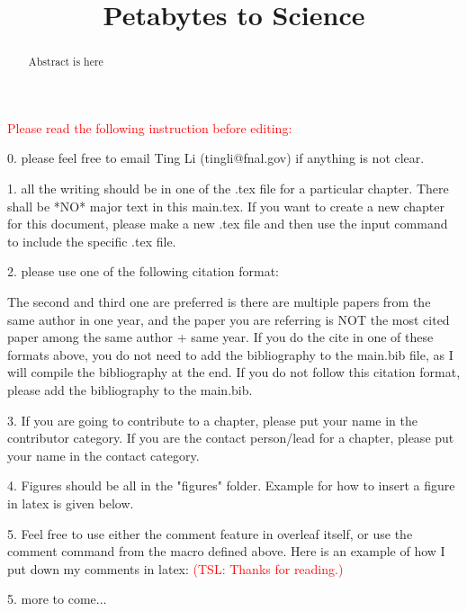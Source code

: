\documentclass[modern,linenumbers]{aastex62}
\newcommand{\Comment}[3]{\textcolor{#1}{(#2: #3)}}
\newcommand{\TSL}[1]{\Comment{red}{TSL}{#1}} %
\begin{document}
\title{\Large Petabytes to Science}



\begin{abstract}
Abstract is here
\end{abstract}

\tableofcontents 

\textcolor{red}{Please read the following instruction before editing:} 

0. please feel free to email Ting Li (tingli@fnal.gov) if anything is not clear.

1. all the writing should be in one of the .tex file for a particular chapter. There shall be *NO* major text in this main.tex. If you want to create a new chapter for this document, please make a new .tex file and then use the input command to include the specific .tex file.

2. please use one of the following citation format:

\cite{Li2018}
\citep{Li2018ApJ...866...22L}
\citet{2018ApJ...866...22L}
The second and third one are preferred is there are multiple papers from the same author in one year, and the paper you are referring is NOT the most cited paper among the same author + same year. If you do the cite in one of these formats above, you do not need to add the bibliography to the main.bib file, as I will compile the bibliography at the end. If you do not follow this citation format, please add the bibliography to the main.bib.

3. If you are going to contribute to a chapter, please put your name in the contributor category. If you are the contact person/lead for a chapter, please put your name in the contact category.

4. Figures should be all in the "figures" folder. Example for how to insert a figure in latex is given below. 

5. Feel free to use either the comment feature in overleaf itself, or use the comment command from the macro defined above. Here is an example of how I put down my comments in latex: \TSL{Thanks for reading.}

5. more to come...




\end{document}
